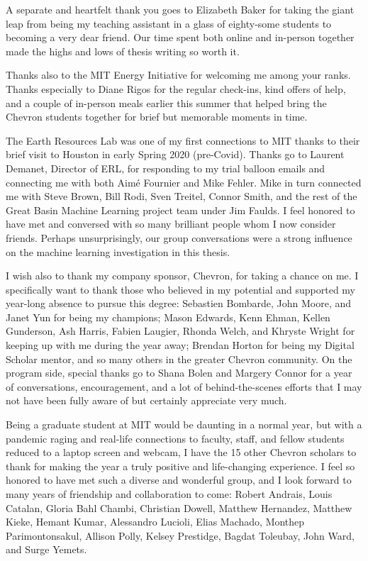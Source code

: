 A separate and heartfelt thank you goes to Elizabeth Baker for taking the giant leap from being my teaching assistant in a glass of eighty-some students to becoming a very dear friend. Our time spent both online and in-person together made the highs and lows of thesis writing so worth it.

Thanks also to the MIT Energy Initiative for welcoming me among your ranks. Thanks especially to Diane Rigos for the regular check-ins, kind offers of help, and a couple of in-person meals earlier this summer that helped bring the Chevron students together for brief but memorable moments in time.

The Earth Resources Lab was one of my first connections to MIT thanks to their brief visit to Houston in early Spring 2020 (pre-Covid). Thanks go to Laurent Demanet, Director of ERL, for responding to my trial balloon emails and connecting me with both Aim\'e Fournier and Mike Fehler. Mike in turn connected me with Steve Brown, Bill Rodi, Sven Treitel, Connor Smith, and the rest of the Great Basin Machine Learning project team under Jim Faulds. I feel honored to have met and conversed with so many brilliant people whom I now consider friends. Perhaps unsurprisingly, our group conversations were a strong influence on the machine learning investigation in this thesis.

I wish also to thank my company sponsor, Chevron, for taking a chance on me. I specifically want to thank those who believed in my potential and supported my year-long absence to pursue this degree: Sebastien Bombarde, John Moore, and Janet Yun for being my champions; Mason Edwards, Kenn Ehman, Kellen Gunderson, Ash Harris, Fabien Laugier, Rhonda Welch, and Khryste Wright for keeping up with me during the year away; Brendan Horton for being my Digital Scholar mentor, and so many others in the greater Chevron community. On the program side, special thanks go to Shana Bolen and Margery Connor for a year of conversations, encouragement, and a lot of behind-the-scenes efforts that I may not have been fully aware of but certainly appreciate very much.

Being a graduate student at MIT would be daunting in a normal year, but with a pandemic raging and real-life connections to faculty, staff, and fellow students reduced to a laptop screen and webcam, I have the 15 other Chevron scholars to thank for making the year a truly positive and life-changing experience. I feel so honored to have met such a diverse and wonderful group, and I look forward to many years of friendship and collaboration to come: Robert Andrais, Louis Catalan, Gloria Bahl Chambi, Christian Dowell, Matthew Hernandez, Matthew Kieke, Hemant Kumar, Alessandro Lucioli, Elias Machado, Monthep Parimontonsakul, Allison Polly, Kelsey Prestidge, Bagdat Toleubay, John Ward, and Surge Yemets.

